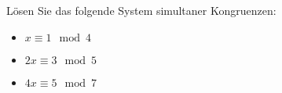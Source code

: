 
\begin{exercise}

Lösen Sie das folgende System simultaner Kongruenzen:

\begin{itemize}
    \item $x \equiv 1 \mod{4}$
    \item $2x \equiv 3 \mod{5}$
    \item $4x \equiv 5 \mod{7}$
\end{itemize}

\end{exercise}


\begin{solution}

\phantom{}

\end{solution}

